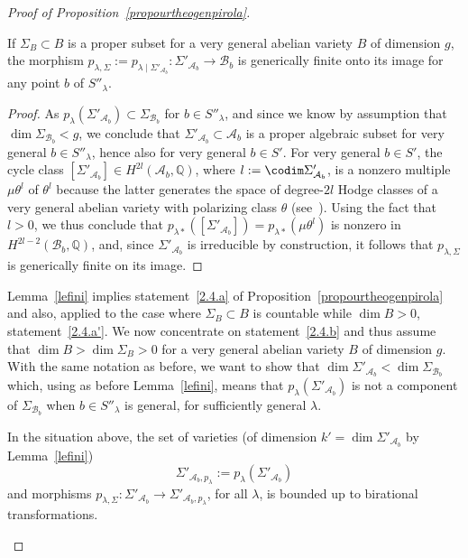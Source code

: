\begin{proof}[Proof of Proposition~\ref{propourtheogenpirola}]
\begin{lemm}\label{lefini}
If $\Sigma_B\subset B$ is a proper subset for a very general
abelian variety $B$ of dimension $g$, the morphism $p_{\lambda,\Sigma}:=p_{\lambda\mid \Sigma'_{\mathcal{A}_b}}:\Sigma'_{\mathcal{A}_b}\rightarrow \mathcal{B}_b$ is generically finite onto its image for any point $b$ of $S''_\lambda$.
\end{lemm}

\begin{proof}
As $p_\lambda(\Sigma'_{\mathcal{A}_b})\subset \Sigma_{\mathcal{B}_b}$ for $b\in S''_\lambda$, and since we know by assumption that $\dim \Sigma_{\mathcal{B}_b}<g$, we conclude that $\Sigma'_{\mathcal{A}_b}\subset \mathcal{A}_b$ is a proper algebraic subset for very general $b\in S''_\lambda$, hence also for very general $b\in S'$. For very general $b\in S'$, the cycle class $[\Sigma'_{\mathcal{A}_b}]\in H^{2l}(\mathcal{A}_b,\mathbb{Q})$, where $l:=\codim \Sigma'_{\mathcal{A}_b}$, is a nonzero multiple $\mu \theta^l$ of $\theta^l$ because the latter generates the space of degree-$2l$ Hodge classes of a very general abelian variety with polarizing class $\theta$ (see~\cite{mattuck}). Using the fact that $l>0$, we thus conclude that $p_{\lambda*}([\Sigma'_{\mathcal{A}_b}])=p_{\lambda*}(\mu \theta^l)$ is nonzero in $H^{2l-2}(\mathcal{B}_b,\mathbb{Q})$, and, since $\Sigma'_{\mathcal{A}_b}$ is irreducible by construction, it follows that $p_{\lambda,\Sigma}$ is generically finite on its image.
\end{proof}

Lemma~\ref{lefini} implies statement~\eqref{2.4.a} of Proposition~\ref{propourtheogenpirola} and also, applied to the case where $\Sigma_{{B}}\subset {B}$ is countable while $\dim {B}>0$, statement~\eqref{2.4.a'}. We now concentrate on statement~\eqref{2.4.b} and thus assume that $\dim B>\dim \Sigma_B>0$ for a very general abelian variety $B$ of dimension $g$. With the same notation as before, we want to show that $\dim \Sigma'_{\mathcal{A}_b}<\dim \Sigma_{\mathcal{B}_b}$ which, using as before Lemma~\ref{lefini}, means that $p_\lambda(\Sigma'_{\mathcal{A}_b})$ is not a component of $\Sigma_{\mathcal{B}_b}$ when $b\in S''_\lambda$ is general, for sufficiently general $\lambda$.

\begin{lemm}\label{lebounded}
In the situation above, the set of varieties (of dimension $k'=\dim \Sigma'_{\mathcal{A}_b}$ by Lemma~\ref{lefini})
\[
\Sigma'_{\mathcal{A}_b,p_\lambda}:=p_\lambda(\Sigma'_{\mathcal{A}_b})
\]
and morphisms $ p_{\lambda,\Sigma}: \Sigma'_{\mathcal{A}_b}\rightarrow \Sigma'_{\mathcal{A}_b,p_\lambda}$, for all $\lambda$, is bounded up to birational transformations.
\end{lemm}


\end{proof}
